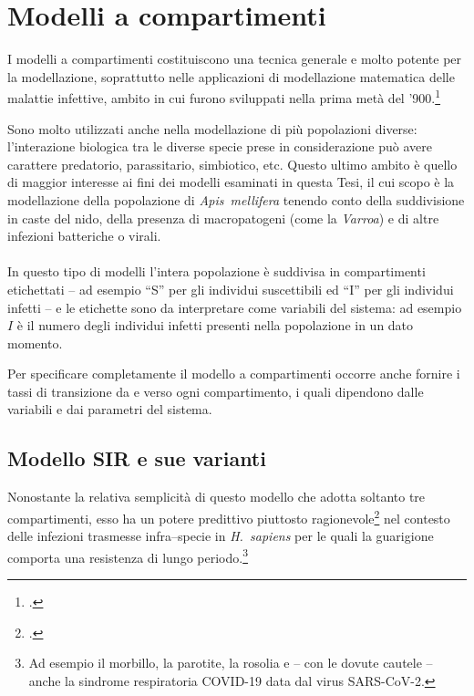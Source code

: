 \section{Modelli a compartimenti}
I modelli a compartimenti costituiscono una tecnica generale e molto potente per la modellazione, soprattutto nelle
applicazioni di modellazione matematica delle malattie infettive, ambito in cui furono sviluppati nella prima metà
del '900.\footcite{kmk,kdg}

Sono molto utilizzati anche nella modellazione di più popolazioni diverse: l'interazione biologica tra le diverse specie
prese in considerazione può avere carattere predatorio, parassitario, simbiotico, etc.
Questo ultimo ambito è quello di maggior interesse ai fini dei modelli esaminati in questa Tesi, il cui scopo è
la modellazione della popolazione di \emph{Apis~mellifera} tenendo conto della suddivisione in caste del nido, della
presenza di macropatogeni (come la \emph{Varroa}) e di altre infezioni batteriche o virali.

\paragraph{}
In questo tipo di modelli l'intera popolazione è suddivisa in compartimenti etichettati -- ad esempio ``S'' per gli
individui suscettibili ed ``I'' per gli individui infetti -- e le etichette sono da interpretare come variabili del sistema:
ad esempio $I$ è il numero degli individui infetti presenti nella popolazione in un dato momento.

Per specificare completamente il modello a compartimenti occorre anche fornire i tassi di transizione da e verso ogni
compartimento, i quali dipendono dalle variabili e dai parametri del sistema.

\subsection{Modello SIR e sue varianti}
Nonostante la relativa semplicità di questo modello che adotta soltanto tre compartimenti, esso ha un potere predittivo
piuttosto ragionevole\footcite{chinaVirus} nel contesto delle infezioni trasmesse infra--specie in \emph{H.~sapiens}
per le quali la guarigione comporta una resistenza di lungo periodo.\footnote{Ad esempio il morbillo, la parotite,
la rosolia e -- con le dovute cautele -- anche la sindrome respiratoria COVID-19 data dal virus SARS-CoV-2.}




